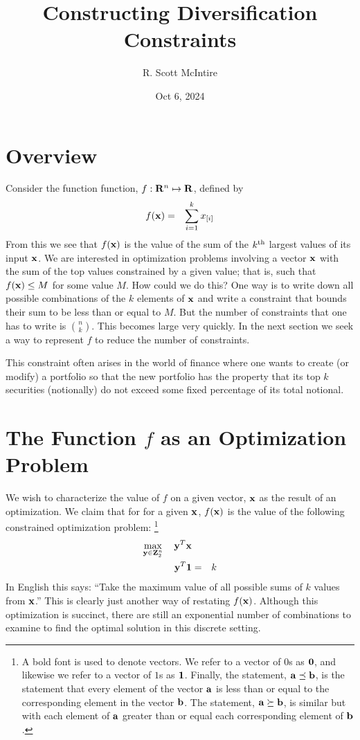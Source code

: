 \documentclass[12pt]{article}
\title{Constructing Diversification Constraints}
\author{R. Scott McIntire}
\date{Oct 6, 2024}
\begin{document}
\maketitle

\section{Overview}
Consider the function function, $f: {\bf R}^n \mapsto {\bf R}$, defined by
\begin{eqnarray}
	f({\bf x}) & = & \sum_{i=1}^k x_{[i]} 
\end{eqnarray}
From this we see that $f({\bf x})$ is the value of the sum of the $k^{\rm th}$ 
largest values of its input ${\bf x}$.
We are interested in optimization problems involving a vector ${\bf x}$ 
with the sum of the top values constrained by a given value; that is, 
such that $f({\bf x}) \le M$  for some value $M$.
How could we do this? One way is to write down all possible combinations of the 
$k$ elements of ${\bf x}$ and write a constraint that bounds their sum to be 
less than or equal to $M$.  But the number of constraints that one has to 
write is $n \choose k$. This becomes large very quickly. 
In the next section we seek a way to represent $f$ to 
reduce the number of constraints.

This constraint often arises in the world of finance where one wants to 
create (or modify) a portfolio so that the new portfolio has the property
that its top $k$ securities (notionally) do not exceed some fixed percentage 
of its total notional.

\section{The Function $f$ as an Optimization Problem}
We wish to characterize the value of $f$ on a given vector, ${\bf x}$ as 
the result of an optimization.
We claim that for for a given ${\bf x}$, $f({\bf x})$ is the value of 
the following constrained optimization problem:%
\footnote{A bold font is used to denote vectors. We refer to a  
vector of $0$s as ${\bf 0}$, and likewise we refer to a vector of $1$s
as ${\bf 1}$. Finally, the statement, ${\bf a} \preceq {\bf b}$, is the 
statement that every element of the vector ${\bf a}$ is less than or equal
to the corresponding element in the vector ${\bf b}$. The statement,
${\bf a} \succeq {\bf b}$, is similar but with each element of ${\bf a}$
greater than or equal each corresponding element of ${\bf b}$.
}
\begin{eqnarray}
\mathop{\rm max}_{{\bf y} \in {\bf Z}_2^n}\limits \quad {\bf y}^T {\bf x} && \\
{\bf y}^T {\bf 1} & = & k 
\end{eqnarray}
In English this says: ``Take the maximum value of all possible sums of $k$ 
values from ${\bf x}$.'' This is clearly just another way of restating $f({\bf x})$.
Although this optimization is succinct, there are still an exponential number 
of combinations to examine to find the optimal solution in this discrete setting.
\end{document}

